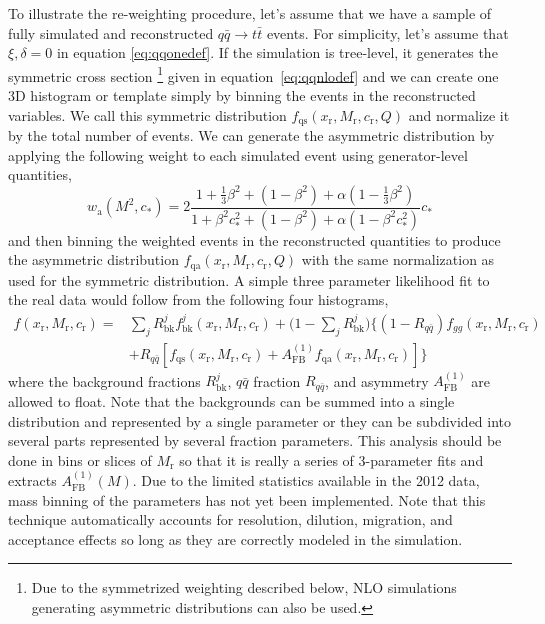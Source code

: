 \documentclass{cmspaperpdf}
\begin{document}
To illustrate the re-weighting procedure, let's assume that we have a sample of fully simulated and reconstructed $q\bar q \to t\bar t$ events.  For simplicity, let's assume that $\xi,\delta=0$ in equation \ref{eq:qqonedef}.  If the simulation is tree-level, it generates the symmetric cross section \footnote{Due to the symmetrized weighting described below, NLO simulations generating asymmetric distributions can also be used.} given in equation~\ref{eq:qqnlodef} and we can create one 3D histogram or template simply by binning the events in the reconstructed variables.  We call this symmetric distribution $f_\mathrm{qs}(x_\mathrm{r}, M_\mathrm{r}, c_\mathrm{r}, Q)$ and normalize it by the total number of events.  We can generate the asymmetric distribution by applying the following weight to each simulated event using generator-level quantities,
\begin{equation}
w_\mathrm{a}(M^2, c_*) = 2\frac{1+\frac{1}{3}\beta^2+(1-\beta^2)+\alpha(1-\frac{1}{3}\beta^2)}{1+\beta^2c_*^2+\left(1-\beta^2\right)+\alpha\left(1-\beta^2c_*^2\right)}c_*
\end{equation}
and then binning the weighted events in the reconstructed quantities to produce the asymmetric distribution $f_\mathrm{qa}(x_\mathrm{r}, M_\mathrm{r}, c_\mathrm{r}, Q)$ with the same normalization as used for the symmetric distribution.  A simple three parameter likelihood fit to the real data would follow from the following four histograms,
\begin{align}
f(x_\mathrm{r},M_\mathrm{r},c_\mathrm{r}) =& \sum_jR^j_\mathrm{bk}f^j_\mathrm{bk}(x_\mathrm{r},M_\mathrm{r},c_\mathrm{r})+\biggl(1-\sum_jR^j_\mathrm{bk}\biggr )\biggl\lbrace \left(1-R_{q\bar q}\right) f_{gg}(x_\mathrm{r},M_\mathrm{r},c_\mathrm{r})\nonumber \\ &+R_{q\bar q}\left[f_\mathrm{qs}(x_\mathrm{r}, M_\mathrm{r}, c_\mathrm{r})+A_\mathrm{FB}^{(1)}f_\mathrm{qa}(x_\mathrm{r}, M_\mathrm{r}, c_\mathrm{r})\right]\biggr\rbrace
\label{eq:template_schemeone}
\end{align}
where the background fractions $R^j_\mathrm{bk}$, $q\bar q$ fraction $R_{q\bar q}$, and asymmetry $A_\mathrm{FB}^{(1)}$ are allowed to float.  Note that the backgrounds can be summed into a single distribution and represented by a single parameter or they can be subdivided into several parts represented by several fraction parameters.  This analysis should be done in bins or slices of $M_\mathrm{r}$ so that it is really a series of 3-parameter fits and extracts $A_\mathrm{FB}^{(1)}(M)$.  Due  to the limited statistics available in the 2012 data, mass binning of the parameters has not yet been implemented.  Note that this technique automatically accounts for resolution, dilution, migration, and acceptance effects so long as they are correctly modeled in the simulation.
\end{document}
